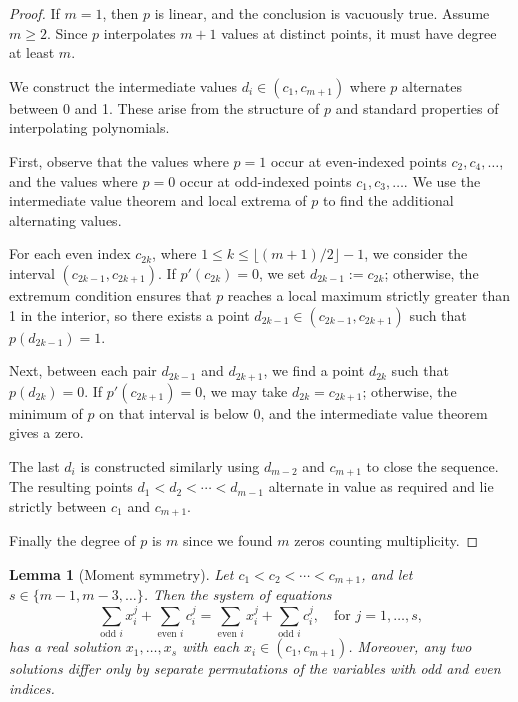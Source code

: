 \documentclass{raex}
\newtheorem{lemma}[theorem]{Lemma}
\theoremstyle{definition}
\begin{document}
\begin{proof}
If \( m = 1 \), then \( p \) is linear, and the conclusion is vacuously true. Assume \( m \geq 2 \). Since \( p \) interpolates \( m+1 \) values at distinct points, it must have degree at least \( m \).

We construct the intermediate values \( d_i \in (c_1, c_{m+1}) \) where \( p \) alternates between 0 and 1. These arise from the structure of \( p \) and standard properties of interpolating polynomials.

First, observe that the values where \( p = 1 \) occur at even-indexed points \( c_{2}, c_{4}, \dots \), and the values where \( p = 0 \) occur at odd-indexed points \( c_1, c_3, \dots \). We use the intermediate value theorem and local extrema of \( p \) to find the additional alternating values.

For each even index \( c_{2k} \), where \( 1 \leq k \leq \lfloor (m+1)/2 \rfloor - 1 \), we consider the interval \( (c_{2k-1}, c_{2k+1}) \). If \( p'(c_{2k}) = 0 \), we set \( d_{2k-1} := c_{2k} \); otherwise, the extremum condition ensures that \( p \) reaches a local maximum strictly greater than 1 in the interior, so there exists a point \( d_{2k-1} \in (c_{2k-1}, c_{2k+1}) \) such that \( p(d_{2k-1}) = 1 \).

Next, between each pair \( d_{2k-1} \) and \( d_{2k+1} \), we find a point \( d_{2k} \) such that \( p(d_{2k}) = 0 \).  If \( p'(c_{2k+1}) = 0 \), we may take \( d_{2k} = c_{2k+1} \); otherwise, the minimum of \( p \) on that interval is below 0, and the intermediate value theorem gives a zero.

The last \( d_i \) is constructed similarly using \( d_{m-2} \) and \( c_{m+1} \) to close the sequence. The resulting points \( d_1 < d_2 < \cdots < d_{m-1} \) alternate in value as required and lie strictly between \( c_1 \) and \( c_{m+1} \).

Finally the degree of $p$ is $m$ since we found $m$ zeros counting multiplicity.
\end{proof}

\begin{lemma}[Moment symmetry]\label{l2}
Let \( c_1 < c_2 < \cdots < c_{m+1} \), and let \( s \in \{m-1, m-3, \dots\} \). Then the system of equations
\[
\sum_{\text{odd } i} x_i^j + \sum_{\text{even } i} c_i^j = \sum_{\text{even } i} x_i^j + \sum_{\text{odd } i} c_i^j, \quad \text{for } j = 1, \dots, s,
\]
has a real solution \( x_1, \ldots, x_s \) with each \( x_i \in (c_1, c_{m+1}) \). Moreover, any two solutions differ only by separate permutations of the variables with odd and even indices.
\end{lemma}
\end{document}
